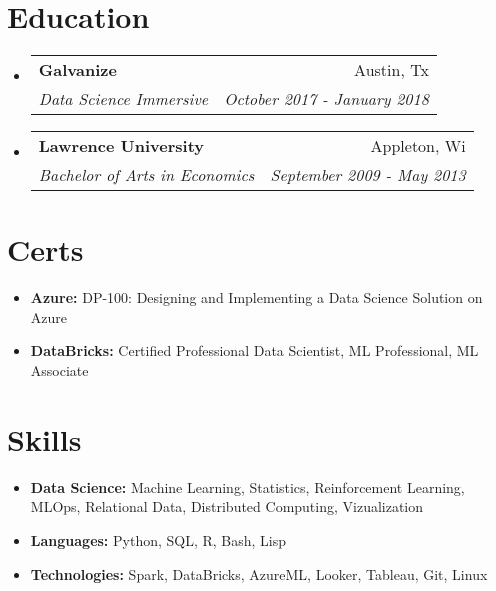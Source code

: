 \documentclass[letterpaper,11pt]{article}
\makeatletter
\newcommand{\resumeItem}[1]{
  \item\small{
    \textbf{#1:}
  }
}
\newcommand{\resumeSubheading}[4]{
  \vspace{-1pt}\item
    \begin{tabular*}{0.97\textwidth}[t]{l@{\extracolsep{\fill}}r}
      \textbf{#1} & #2 \\
      \textit{\small#3} & \textit{\small #4} \\
    \end{tabular*}\vspace{-5pt}
}
\newcommand{\resumeSubItem}[2]{\resumeItem{#1}{#2}\vspace{-4pt}}
\newcommand{\resumeSubHeadingListStart}{\begin{itemize}[leftmargin=*]}
\newcommand{\resumeSubHeadingListEnd}{\end{itemize}}
\makeatother
\begin{document}
\section{Education}
  \resumeSubHeadingListStart
    \resumeSubheading
      {Galvanize}{Austin, Tx}
      {Data Science Immersive}{October 2017 - January 2018}
    \resumeSubheading
      {Lawrence University}{Appleton, Wi}
      {Bachelor of Arts in Economics}{September 2009 - May 2013}
  \resumeSubHeadingListEnd


\section{Certs}
  \resumeSubHeadingListStart
    \resumeSubItem{Azure}
      {DP-100: Designing and Implementing a Data Science Solution on Azure}
    \resumeSubItem{DataBricks}
      {Certified Professional Data Scientist, ML Professional, ML Associate}
  \resumeSubHeadingListEnd



\section{Skills}
  \resumeSubHeadingListStart
    \resumeSubItem{Data Science}
      {Machine Learning, Statistics, Reinforcement Learning, MLOps, Relational Data, Distributed Computing, Vizualization}
    \resumeSubItem{Languages}
      {Python, SQL, R, Bash, Lisp}
    \resumeSubItem{Technologies}
      {Spark, DataBricks, AzureML, Looker, Tableau, Git, Linux}
  \resumeSubHeadingListEnd

\end{document}
